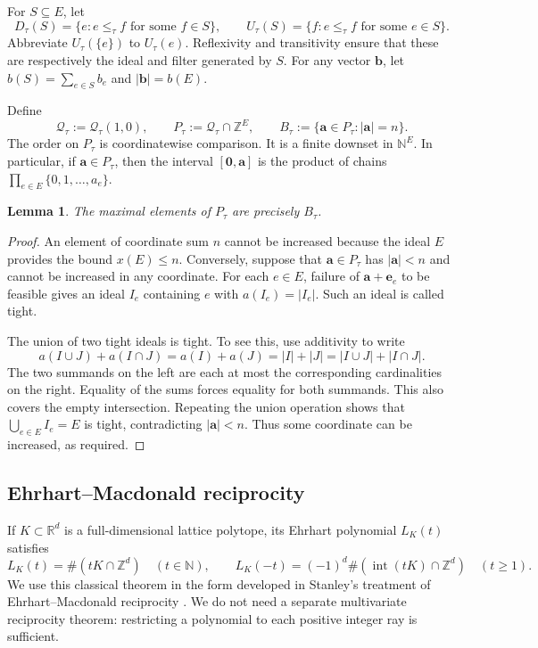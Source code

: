 \documentclass[11pt,letterpaper]{article}
\newtheorem{lemma}[lemma]{Lemma}
\theoremstyle{definition}
\newcommand{\N}{\mathbb N}
\newcommand{\Z}{\mathbb Z}
\newcommand{\R}{\mathbb R}
\newcommand{\zero}{\mathbf 0}
\newcommand{\bvec}{\mathbf b}
\newcommand{\avec}{\mathbf a}
\newcommand{\QQ}{\mathcal Q}
\DeclareMathOperator{\Int}{int}
\newcommand{\card}[1]{\lvert #1\rvert}
\newcommand{\sumv}[1]{\lvert #1\rvert}
\begin{document}
For $S\subseteq E$, let
\[
 D_\tau(S)=\{e:e\leq_\tau f\text{ for some }f\in S\},\qquad
 U_\tau(S)=\{f:e\leq_\tau f\text{ for some }e\in S\}.
\]
Abbreviate $U_\tau(\{e\})$ to $U_\tau(e)$. Reflexivity and transitivity ensure
that these are respectively the ideal and filter generated by $S$.
For any vector $\bvec$, let $b(S)=\sum_{e\in S}b_e$ and
$\sumv{\bvec}=b(E)$.

Define
\begin{equation}\label{eq:basic-P}
 \QQ_\tau:=\QQ_\tau(1,0),\qquad
 P_\tau:=\QQ_\tau\cap\Z^E,
 \qquad B_\tau:=\{\avec\in P_\tau:\sumv{\avec}=n\}.
\end{equation}
The order on $P_\tau$ is coordinatewise comparison. It is a finite downset
in $\N^E$. In particular, if $\avec\in P_\tau$, then the interval
$[\zero,\avec]$ is the product of chains
$\prod_{e\in E}\{0,1,\ldots,a_e\}$.

\begin{lemma}\label{lem:maximal}
The maximal elements of $P_\tau$ are precisely $B_\tau$.
\end{lemma}
\begin{proof}
An element of coordinate sum $n$ cannot be increased because the ideal $E$
provides the bound $x(E)\leq n$. Conversely, suppose that $\avec\in P_\tau$
has $\sumv{\avec}<n$ and cannot be increased in any coordinate. For each
$e\in E$, failure of $\avec+\mathbf e_e$ to be feasible gives an ideal
$I_e$ containing $e$ with $a(I_e)=\card{I_e}$. Such an ideal is called tight.

The union of two tight ideals is tight. To see this, use additivity to write
\[
 a(I\cup J)+a(I\cap J)=a(I)+a(J)=\card I+\card J
 =\card{I\cup J}+\card{I\cap J}.
\]
The two summands on the left are each at most the corresponding cardinalities
on the right. Equality of the sums forces equality for both summands. This
also covers the empty intersection. Repeating the union operation shows that
$\bigcup_{e\in E}I_e=E$ is tight, contradicting $\sumv{\avec}<n$.
Thus some coordinate can be increased, as required.
\end{proof}

\subsection{Ehrhart--Macdonald reciprocity}
If $K\subset\R^d$ is a full-dimensional lattice polytope, its Ehrhart
polynomial $L_K(t)$ satisfies
\begin{equation}\label{eq:EM}
 L_K(t)=\#(tK\cap\Z^d)\quad(t\in\N),\qquad
 L_K(-t)=(-1)^d\#(\Int(tK)\cap\Z^d)\quad(t\geq1).
\end{equation}
We use this classical theorem in the form developed in Stanley's treatment
of Ehrhart--Macdonald reciprocity \cite[Section~6]{Stanley74}. We do not need a
separate multivariate reciprocity theorem: restricting a polynomial to each
positive integer ray is sufficient.
\end{document}
